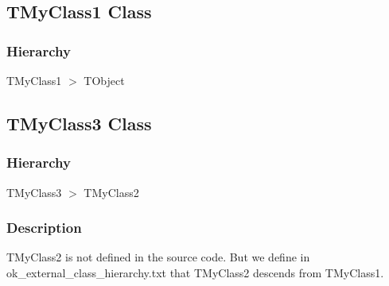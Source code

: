 \documentclass{report}
\newif\ifpdf
\begin{document}
\subsection*{TMyClass1 Class}
\fi
\label{ok_external_class_hierarchy.TMyClass1}
\subsubsection*{\large{\textbf{Hierarchy}}\normalsize\hspace{1ex}\hfill}
TMyClass1 {$>$} TObject
\ifpdf
\subsection*{\large{\textbf{TMyClass3 Class}}\normalsize\hspace{1ex}\hrulefill}
\else
\subsection*{TMyClass3 Class}
\fi
\label{ok_external_class_hierarchy.TMyClass3}
\subsubsection*{\large{\textbf{Hierarchy}}\normalsize\hspace{1ex}\hfill}
TMyClass3 {$>$} TMyClass2
\subsubsection*{\large{\textbf{Description}}\normalsize\hspace{1ex}\hfill}
TMyClass2 is not defined in the source code. But we define in ok{\_}external{\_}class{\_}hierarchy.txt that TMyClass2 descends from TMyClass1.
\end{document}
